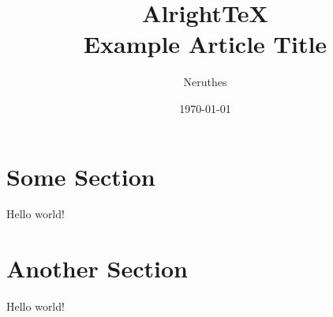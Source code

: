 \documentclass[11pt,a4paper]{article}
\title{AlrightTeX\\Example Article Title}
\author{Neruthes}
\date{\today}
\begin{document}
\maketitle

\tableofcontents

\section{Some Section}
Hello world!

\lipsum[1-3][1-5]


\section{Another Section}
Hello world!

\lipsum[1-3][1-5]
\end{document}
